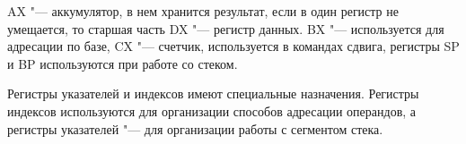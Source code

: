 AX "--- аккумулятор, в нем хранится результат, если в один регистр не умещается, то старшая часть DX "--- регистр данных.
BX "--- используется для адресации по базе, CX "--- счетчик, используется в командах сдвига, регистры SP и BP используются при работе со стеком.

Регистры указателей и индексов имеют специальные назначения. Регистры индексов используются для организации способов адресации операндов, а регистры указателей "--- для организации работы с сегментом стека.

